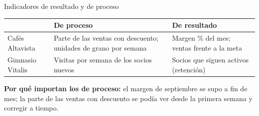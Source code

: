 \documentclass[aspectratio=169,11pt]{beamer}
\begin{document}
\begin{frame}[t]{Indicadores de resultado y de proceso}
  \begin{center}
  \end{center}
  \footnotesize
  \renewcommand{\arraystretch}{1.25}
  \begin{tabular}{@{}L{2.5cm}L{5.3cm}L{5.3cm}@{}}
    \toprule
    & \textbf{De proceso} & \textbf{De resultado} \\
    \midrule
    Cafés Altavista & Parte de las ventas con descuento; unidades de grano por semana & Margen \% del mes; ventas frente a la meta \\
    Gimnasio Vitalis & Visitas por semana de los socios nuevos & Socios que siguen activos (retención) \\
    \bottomrule
  \end{tabular}
  \vspace{0.15cm}

  \footnotesize\textbf{Por qué importan los de proceso:} el margen de
  septiembre se supo a fin de mes; la parte de las ventas con descuento se
  podía ver desde la primera semana y corregir a tiempo.
\end{frame}

\end{document}
